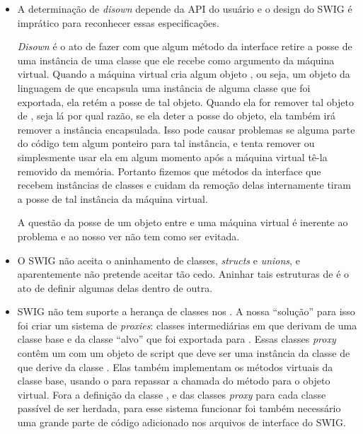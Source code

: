   \begin{itemize}
    \item A determinação de \textit{disown} depende da API do usuário e o design do SWIG é
      imprático para reconhecer essas especificações.
      
      \textit{Disown} é o ato de fazer com que algum método da interface \CXX{} retire a posse
      de uma instância de uma classe \CXX{} que ele recebe como argumento da máquina virtual. 
      Quando a máquina virtual cria algum objeto \CXX{}, ou seja, um objeto da linguagem de 
      \script{} que encapsula uma instância de alguma classe \CXX{} que foi exportada, ela
      retém a posse de tal objeto. Quando ela for remover tal objeto de \script{}, seja 
      lá por qual razão, se ela deter a posse do objeto, ela também irá remover a instância 
      \CXX{} encapsulada. Isso pode causar problemas se alguma parte do código \CXX{} tem 
      algum ponteiro para tal instância, e tenta remover ou simplesmente usar ela em algum
      momento após a máquina virtual tê-la removido da memória. Portanto fizemos que métodos
      da interface \CXX{} que recebem instâncias de classes e cuidam da remoção delas 
      internamente tiram a posse de tal instância da máquina virtual.
      
      A questão da posse de um objeto entre \CXX{} e uma máquina virtual é inerente ao
      problema e ao nosso ver não tem como ser evitada.
    \item O SWIG não aceita o aninhamento de classes, \textit{structs} e \textit{unions}, e 
      aparentemente não pretende aceitar tão cedo. Aninhar tais estruturas de \CXX{} é o ato
      de definir algumas delas dentro de outra.
    \item SWIG não tem suporte a herança de classes \CXX{} nos . A nossa ``solução''
      para isso foi criar um sistema de \textit{proxies}\footnotemark: classes intermediárias em
      \CXX{} que derivam de uma classe base  e da classe ``alvo'' \CXX{} que foi
      exportada para \script{}. Essas classes \textit{proxy} contêm um \VObj{} com um objeto de
      script que deve ser uma instância da classe de \script{} que derive da classe \CXX{}. Elas
      também implementam os métodos virtuais da classe base, usando o \VObj{} para repassar a
      chamada do método para o objeto virtual. Fora a definição da classe , e
      das classes \textit{proxy} para cada classe \CXX{} passível de ser herdada, para esse
      sistema funcionar foi também necessário uma grande parte de código adicionado nos arquivos de
      interface do SWIG.
      

\end{itemize}
